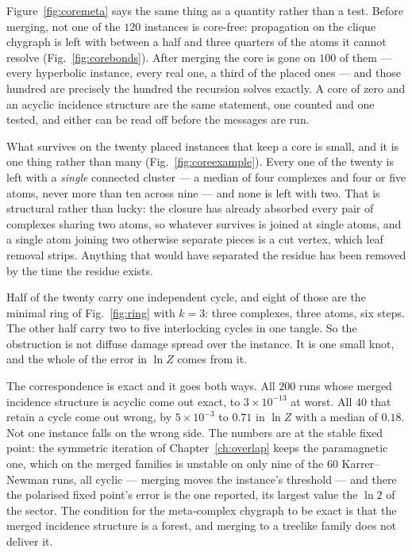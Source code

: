 Figure~\ref{fig:coremeta} says the same thing as a quantity rather than a test.
Before merging, not one of the $120$ instances is core-free: propagation on the
clique chygraph is left with between a half and three quarters of the atoms it
cannot resolve (Fig.~\ref{fig:corebonds}). After merging the core is gone on
$100$ of them --- every hyperbolic instance, every real one, a third of the
placed ones --- and those hundred are precisely the hundred the recursion solves
exactly. A core of zero and an acyclic incidence structure are the same
statement, one counted and one tested, and either can be read off before the
messages are run.

What survives on the twenty placed instances that keep a core is small, and it
is one thing rather than many (Fig.~\ref{fig:coreexample}). Every one of the
twenty is left with a \emph{single} connected cluster --- a median of four
complexes and four or five atoms, never more than ten across nine --- and none
is left with two. That is structural rather than lucky: the closure has
already absorbed every pair of complexes sharing two atoms, so whatever survives is joined at
single atoms, and a single atom joining two otherwise separate pieces is a cut
vertex, which leaf removal strips. Anything that would have separated the
residue has been removed by the time the residue exists.

Half of the twenty carry one independent cycle, and eight of those are the
minimal ring of Fig.~\ref{fig:ring} with $k=3$: three complexes, three atoms,
six steps. The other half carry two to five interlocking cycles in one tangle.
So the obstruction is not diffuse damage spread over the instance. It is one small
knot, and the whole of the error in $\ln Z$ comes from it.

The correspondence is exact and it goes both ways. All $200$ runs whose merged
incidence structure is acyclic come out exact, to $3\times10^{-13}$ at worst.
All $40$ that retain a cycle come out wrong, by $5\times10^{-3}$ to $0.71$ in
$\ln Z$ with a median of $0.18$. Not one instance falls on the wrong side. The
numbers are at the stable fixed point: the symmetric iteration of
Chapter~\ref{ch:overlap} keeps the paramagnetic one, which on the merged
families is unstable on only nine of the $60$ Karrer--Newman runs, all cyclic
--- merging moves the instance's threshold --- and there the polarised fixed
point's error is the one reported, its largest value the $\ln2$ of the
sector. The
condition for the meta-complex chygraph to be exact is that the merged incidence
structure is a forest, and merging to a treelike family does not deliver it.

